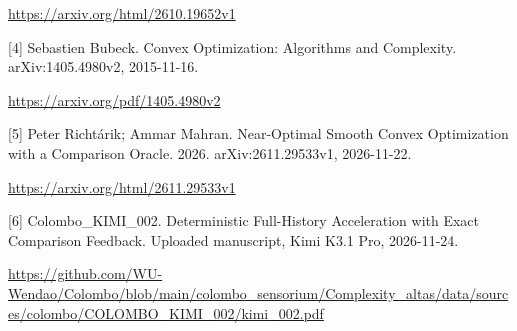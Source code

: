 \documentclass[10pt,a4paper]{article}
\begin{document}
\url{https://arxiv.org/html/2610.19652v1}



[4] Sebastien Bubeck. Convex Optimization: Algorithms and Complexity. arXiv:1405.4980v2, 2015-11-16.



\url{https://arxiv.org/pdf/1405.4980v2}



[5] Peter Richtárik; Ammar Mahran. Near-Optimal Smooth Convex Optimization with a Comparison Oracle. 2026. arXiv:2611.29533v1, 2026-11-22.



\url{https://arxiv.org/html/2611.29533v1}



[6] Colombo\_KIMI\_002. Deterministic Full-History Acceleration with Exact Comparison Feedback. Uploaded manuscript, Kimi K3.1 Pro, 2026-11-24.



\url{https://github.com/WU-Wendao/Colombo/blob/main/colombo_sensorium/Complexity_altas/data/sources/colombo/COLOMBO_KIMI_002/kimi_002.pdf}
\end{document}
